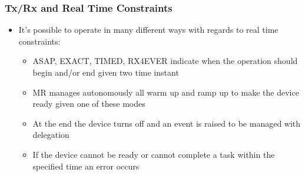 \begin{frame}[fragile]
  \frametitle{Tx/Rx and Real Time Constraints}
  \begin{itemize}
    \item It's possible to operate in many different ways with regards to real time constraints:
    \begin{itemize}
    	\item ASAP, EXACT, TIMED, RX4EVER indicate when the operation should begin and/or end given two time instant
    	\item MR manages autonomously all warm up and ramp up to make the device ready given one of these modes
    	\item At the end the device turns off and an event is raised to be managed with delegation
    	\item If the device cannot be ready or cannot complete a task within the specified time an error occurs
    \end{itemize}
  \end{itemize}
\end{frame}